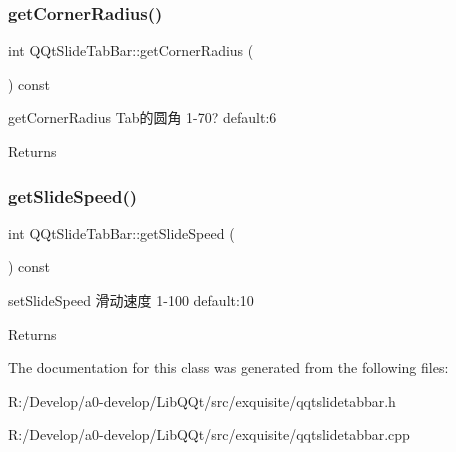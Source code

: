\subsubsection{\texorpdfstring{get\+Corner\+Radius()}{getCornerRadius()}}
{\footnotesize\ttfamily int Q\+Qt\+Slide\+Tab\+Bar\+::get\+Corner\+Radius (\begin{DoxyParamCaption}{ }\end{DoxyParamCaption}) const\hspace{0.3cm}{\ttfamily [inline]}}



get\+Corner\+Radius Tab的圆角 1-\/70? default\+:6 

\begin{DoxyReturn}{Returns}

\end{DoxyReturn}
\mbox{\label{class_q_qt_slide_tab_bar_a8eb9d5bd680aabb2f760b4cd2f8c422d}} 
\subsubsection{\texorpdfstring{get\+Slide\+Speed()}{getSlideSpeed()}}
{\footnotesize\ttfamily int Q\+Qt\+Slide\+Tab\+Bar\+::get\+Slide\+Speed (\begin{DoxyParamCaption}{ }\end{DoxyParamCaption}) const\hspace{0.3cm}{\ttfamily [inline]}}



set\+Slide\+Speed 滑动速度 1-\/100 default\+:10 

\begin{DoxyReturn}{Returns}

\end{DoxyReturn}


The documentation for this class was generated from the following files\+:\begin{DoxyCompactItemize}
\item 
R\+:/\+Develop/a0-\/develop/\+Lib\+Q\+Qt/src/exquisite/qqtslidetabbar.\+h\item 
R\+:/\+Develop/a0-\/develop/\+Lib\+Q\+Qt/src/exquisite/qqtslidetabbar.\+cpp\end{DoxyCompactItemize}
